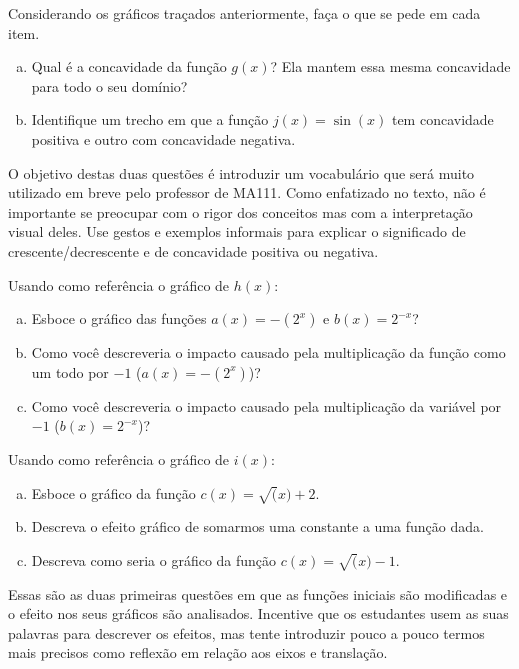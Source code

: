 \documentclass[main_estudante.tex]{subfiles}
\begin{document}
\begin{questao}
Considerando os gráficos traçados anteriormente, faça o que se pede em cada item.
\begin{enumerate}[a)]
\item Qual é a concavidade da função $g(x)$? Ela mantem essa mesma concavidade para todo o seu domínio?
\item Identifique um trecho em que a função $j(x)=\sin(x)$ tem concavidade positiva e outro com concavidade negativa.
\end{enumerate}
\end{questao}

O objetivo destas duas questões é introduzir um vocabulário que será muito utilizado em breve pelo professor de MA111. Como enfatizado no texto, não é importante se preocupar com o rigor dos conceitos mas com a interpretação visual deles. Use gestos e exemplos informais para explicar o significado de crescente/decrescente e de concavidade positiva ou negativa.

\begin{questao}
Usando como referência o gráfico de $h(x)$:
\begin{enumerate}[a)]
\item Esboce o gráfico das funções $a(x)=-(2^x)$ e $b(x)=2^{-x}$?
\item Como você descreveria o impacto causado pela multiplicação da função como um todo por $-1$ ($a(x)=-(2^x)$)?
\item Como você descreveria o impacto causado pela multiplicação da variável por $-1$ ($b(x)=2^{-x}$)?
\end{enumerate}
\end{questao}

\begin{questao}
Usando como referência o gráfico de $i(x)$:
\begin{enumerate}[a)]
\item Esboce o gráfico da função $c(x)=\sqrt(x)+2$.
\item Descreva o efeito gráfico de somarmos uma constante a uma função dada.
\item Descreva como seria o gráfico da função $c(x)=\sqrt(x)-1$.
\end{enumerate}
\end{questao}

Essas são as duas primeiras questões em que as funções iniciais são modificadas e o efeito nos seus gráficos são analisados. Incentive que os estudantes usem as suas palavras para descrever os efeitos, mas tente introduzir pouco a pouco termos mais precisos como reflexão em relação aos eixos e translação.
\end{document}
